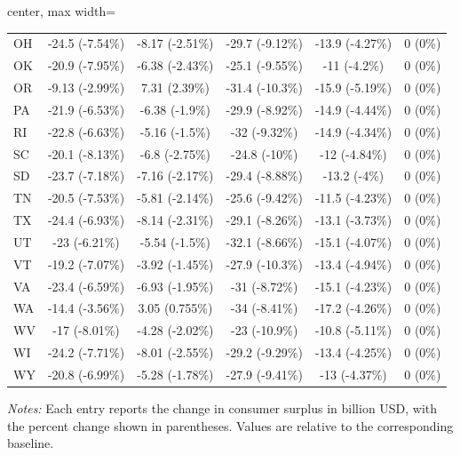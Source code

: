 \begin{table}[!htbp]
\begin{adjustbox}{center, max width=\textwidth}
\begin{threeparttable}
\begin{tabular}{lccccc}
OH & -24.5 (-7.54\%) & -8.17 (-2.51\%) & -29.7 (-9.12\%) & -13.9 (-4.27\%) & 0 (0\%) \\
OK & -20.9 (-7.95\%) & -6.38 (-2.43\%) & -25.1 (-9.55\%) & -11 (-4.2\%) & 0 (0\%) \\
OR & -9.13 (-2.99\%) & 7.31 (2.39\%) & -31.4 (-10.3\%) & -15.9 (-5.19\%) & 0 (0\%) \\
PA & -21.9 (-6.53\%) & -6.38 (-1.9\%) & -29.9 (-8.92\%) & -14.9 (-4.44\%) & 0 (0\%) \\
RI & -22.8 (-6.63\%) & -5.16 (-1.5\%) & -32 (-9.32\%) & -14.9 (-4.34\%) & 0 (0\%) \\
SC & -20.1 (-8.13\%) & -6.8 (-2.75\%) & -24.8 (-10\%) & -12 (-4.84\%) & 0 (0\%) \\
SD & -23.7 (-7.18\%) & -7.16 (-2.17\%) & -29.4 (-8.88\%) & -13.2 (-4\%) & 0 (0\%) \\
TN & -20.5 (-7.53\%) & -5.81 (-2.14\%) & -25.6 (-9.42\%) & -11.5 (-4.23\%) & 0 (0\%) \\
TX & -24.4 (-6.93\%) & -8.14 (-2.31\%) & -29.1 (-8.26\%) & -13.1 (-3.73\%) & 0 (0\%) \\
UT & -23 (-6.21\%) & -5.54 (-1.5\%) & -32.1 (-8.66\%) & -15.1 (-4.07\%) & 0 (0\%) \\
VT & -19.2 (-7.07\%) & -3.92 (-1.45\%) & -27.9 (-10.3\%) & -13.4 (-4.94\%) & 0 (0\%) \\
VA & -23.4 (-6.59\%) & -6.93 (-1.95\%) & -31 (-8.72\%) & -15.1 (-4.23\%) & 0 (0\%) \\
WA & -14.4 (-3.56\%) & 3.05 (0.755\%) & -34 (-8.41\%) & -17.2 (-4.26\%) & 0 (0\%) \\
WV & -17 (-8.01\%) & -4.28 (-2.02\%) & -23 (-10.9\%) & -10.8 (-5.11\%) & 0 (0\%) \\
WI & -24.2 (-7.71\%) & -8.01 (-2.55\%) & -29.2 (-9.29\%) & -13.4 (-4.25\%) & 0 (0\%) \\
WY & -20.8 (-6.99\%) & -5.28 (-1.78\%) & -27.9 (-9.41\%) & -13 (-4.37\%) & 0 (0\%) \\
\bottomrule
\end{tabular}

\begin{tablenotes}[flushleft]\footnotesize
\item \textit{Notes:} Each entry reports the change in consumer surplus in billion USD, with the percent change shown in parentheses. Values are relative to the corresponding baseline.
\end{tablenotes}
\end{threeparttable}
\end{adjustbox}

\end{table}
